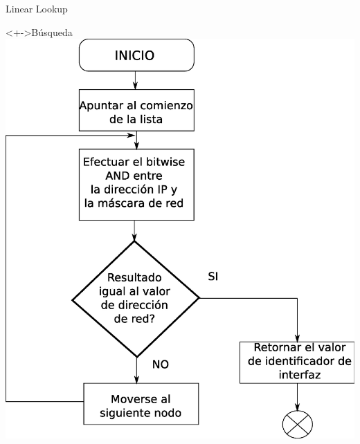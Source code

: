 \documentclass[xcolor=dvipsnames]{beamer}
\begin{document}
\begin{frame}{Linear Lookup}
\begin{block}<+->{Búsqueda}
	\center	
	\includegraphics[scale=0.25]{figures/llusearch.eps}  
\end{block}

\end{frame}
\end{document}
